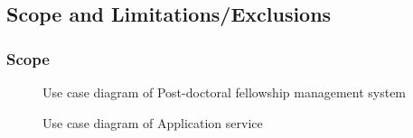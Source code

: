 \documentclass[12pt]{article}
\begin{document}
\subsection{Scope and Limitations/Exclusions} %
\vspace{0.2in}


\subsubsection{Scope}
\vspace{0.2in}

\begin{figure}[H]
\centering	
{}
\caption{Use case diagram of Post-doctoral fellowship management system}
\end{figure}

\begin{figure}[H]
\centering	
{}
\caption{Use case diagram of Application service}
\end{figure}
\end{document}
